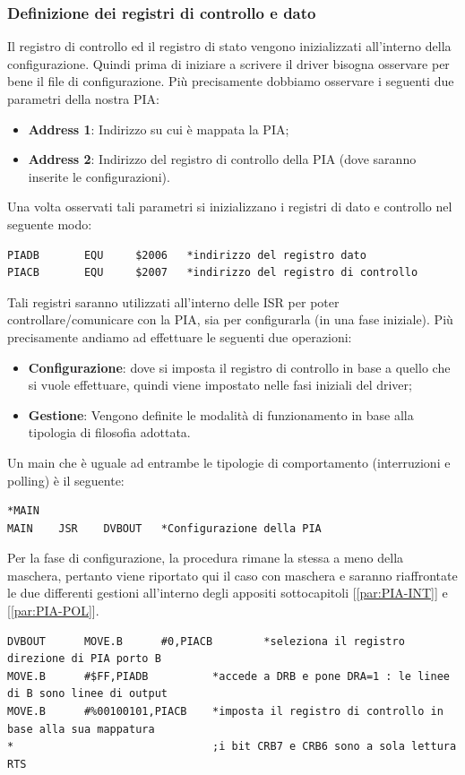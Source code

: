 \subsubsection{Definizione dei registri di controllo e dato}\label{par:cnt-stt}
Il registro di controllo ed il registro di stato vengono inizializzati all'interno della configurazione. Quindi prima di iniziare a scrivere il driver bisogna osservare per bene il file di configurazione. Più precisamente dobbiamo osservare i seguenti due parametri della nostra PIA:
\begin{itemize}
    \item \textbf{Address 1}: Indirizzo su cui è mappata la PIA;
    \item \textbf{Address 2}: Indirizzo del registro di controllo della PIA (dove saranno inserite le configurazioni).
\end{itemize}

Una volta osservati tali parametri si inizializzano i registri di dato e controllo nel seguente modo:
\begin{lstlisting}
PIADB       EQU     $2006	*indirizzo del registro dato 
PIACB       EQU     $2007	*indirizzo del registro di controllo
\end{lstlisting}

Tali registri saranno utilizzati all'interno delle ISR per poter controllare/comunicare con la PIA, sia per configurarla (in una fase iniziale). Più precisamente andiamo ad effettuare le seguenti due operazioni:
\begin{itemize}
    \item \textbf{Configurazione}: dove si imposta il registro di controllo in base a quello che si vuole effettuare, quindi viene impostato nelle fasi iniziali del driver;
    \item \textbf{Gestione}: Vengono definite le modalità di funzionamento in base alla tipologia di filosofia adottata.
\end{itemize}

Un main che è uguale ad entrambe le tipologie di comportamento (interruzioni e polling) è il seguente:
\begin{lstlisting}
*MAIN
MAIN	JSR    DVBOUT	*Configurazione della PIA
\end{lstlisting}

Per la fase di configurazione, la procedura rimane la stessa a meno della maschera, pertanto viene riportato qui il caso con maschera e saranno riaffrontate le due differenti gestioni all'interno degli appositi sottocapitoli [\ref{par:PIA-INT}] e [\ref{par:PIA-POL}].
\begin{lstlisting}
DVBOUT      MOVE.B      #0,PIACB		*seleziona il registro direzione di PIA porto B 
MOVE.B      #$FF,PIADB	  		*accede a DRB e pone DRA=1 : le linee di B sono linee di output	
MOVE.B      #%00100101,PIACB   	*imposta il registro di controllo in base alla sua mappatura
*								;i bit CRB7 e CRB6 sono a sola lettura	
RTS
\end{lstlisting}

